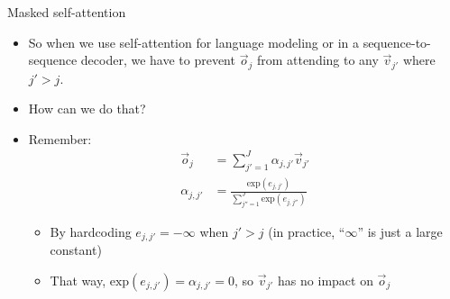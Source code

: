 \documentclass[11pt,compress,t,notes=noshow, xcolor=table]{beamer}
\begin{document}
\begin{vbframe}{Masked self-attention}

\vfill

\begin{itemize}
\item So when we use self-attention for language modeling or in a sequence-to-sequence decoder, we have to prevent $\vec o_j$ from attending to any $\vec v_{j'}$ where $j' > j$.
\item \ques How can we do that?
\item Remember:
$$ \begin{aligned}
\vec o_j & = \sum_{j' = 1}^{J} \alpha_{j,j'} \vec v_{j'} \\
 \alpha_{j,j'} & = \frac{\mathrm{exp}(e_{j,j'})}{\sum_{j'' = 1}^J \mathrm{exp}(e_{j,j''})}
\end{aligned}
$$
\begin{itemize}
\item By hardcoding $e_{j,j'} = -\infty$ when $j' > j$ (in practice, ``$\infty$'' is just a large constant)
\item That way, $\mathrm{exp}(e_{j,j'}) = \alpha_{j,j'} = 0$, so $\vec v_{j'}$ has no impact on $\vec o_j$
\end{itemize}
\end{itemize}

\vfill

\end{vbframe}

\end{document}

